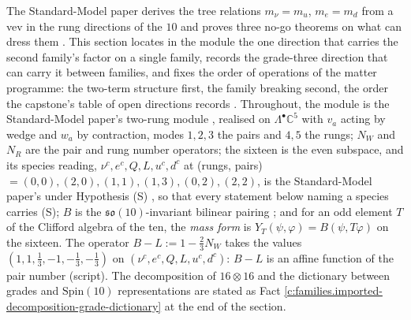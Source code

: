 \documentclass[11pt]{article}
\theoremstyle{definition}
\theoremstyle{plain}
\providecommand{\C}{}\renewcommand{\C}{\mathbb{C}}
\providecommand{\so}{}\renewcommand{\so}{\mathfrak{so}}
\begin{document}
\label{c:note.families.setting-weight-spectrum-order-operations}
The Standard-Model paper derives the tree relations $m_{\nu} = m_{u}$, $m_{e} = m_{d}$ from a vev in the rung directions of the $10$ and proves three no-go theorems on what can dress them \cite[Cor.~9.25, Thms.~9.31, 9.33, 9.35]{ButlerT12}. This section locates in the module the one direction that carries the second family's factor on a single family, records the grade-three direction that can carry it between families, and fixes the order of operations of the matter programme: the two-term structure first, the family breaking second, the order the capstone's table of open directions records \cite[Table~4]{ButlerT17}. Throughout, the module is the Standard-Model paper's two-rung module \cite[Def.~9.8]{ButlerT12}, realised on $\Lambda^{\bullet}\C^{5}$ with $v_{a}$ acting by wedge and $w_{a}$ by contraction, modes $1, 2, 3$ the pairs and $4, 5$ the rungs; $N_{W}$ and $N_{R}$ are the pair and rung number operators; the sixteen is the even subspace, and its species reading, $\nu^{c}, e^{c}, Q, L, u^{c}, d^{c}$ at (rungs, pairs) $= (0,0), (2,0), (1,1), (1,3), (0,2), (2,2)$, is the Standard-Model paper's under Hypothesis (S) \cite[Prop.~5.8]{ButlerT12}, so that every statement below naming a species carries (S); $B$ is the $\so(10)$-invariant bilinear pairing \cite[Lem.~9.23]{ButlerT12}; and for an odd element $T$ of the Clifford algebra of the ten, the \emph{mass form} is $Y_{T}(\psi, \varphi) = B(\psi, T\varphi)$ on the sixteen. The operator $B - L := 1 - \tfrac23 N_{W}$ takes the values $(1, 1, \tfrac13, -1, -\tfrac13, -\tfrac13)$ on $(\nu^{c}, e^{c}, Q, L, u^{c}, d^{c})$: $B - L$ is an affine function of the pair number (script). The decomposition of $16 \otimes 16$ and the dictionary between grades and $\mathrm{Spin}(10)$ representations are stated as Fact \ref{c:families.imported-decomposition-grade-dictionary} at the end of the section.
\end{document}
